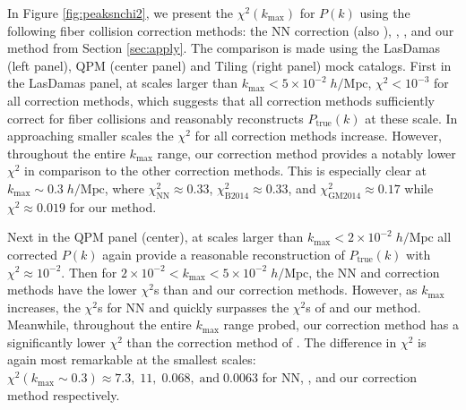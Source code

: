\documentclass{emulateapj}
\begin{document}
In Figure \ref{fig:peaksnchi2}, we present the $\chi^2(k_\mathrm{max})$ for $P(k)$ using the following fiber collision correction methods: the NN correction (also \citealt{Anderson:2012aa}), \cite{Beutler:2014aa}, \cite{Gil-Marin:2014aa}, and our method from Section \ref{sec:apply}. The comparison is made using the LasDamas (left panel), QPM (center panel) and Tiling (right panel) mock catalogs. First in the LasDamas panel, at scales larger than $k_\mathrm{max} < 5 \times 10^{-2} \; h/\mathrm{Mpc}$, $\chi^2 < 10^{-3}$ for all correction methods, which suggests that all correction methods sufficiently correct for fiber collisions and reasonably reconstructs $P_\mathrm{true}(k)$ at these scale. In approaching smaller scales the $\chi^2$ for all correction methods increase. However, throughout the entire $k_\mathrm{max}$ range, our correction method provides a notably lower $\chi^2$ in comparison to the other correction methods. This is especially clear at $k_\mathrm{max} \sim 0.3 \; h/\mathrm{Mpc}$, where $\chi^2_\mathrm{NN} \approx 0.33$, $\chi^2_\mathrm{B2014} \approx 0.33$, and $\chi^2_\mathrm{GM2014} \approx 0.17$ while $\chi^2 \approx 0.019$ for our method. 

Next in the QPM panel (center), at scales larger than $k_\mathrm{max} < 2 \times 10^{-2} \; h/\mathrm{Mpc}$ all corrected $P(k)$ again provide a reasonable reconstruction of $P_\mathrm{true}(k)$ with $\chi^2 \approx 10^{-2}$. Then for $2 \times 10^{-2} < k_\mathrm{max} < 5 \times 10^{-2}\; h/\mathrm{Mpc}$, the NN and \cite{Beutler:2014aa} correction methods have the lower $\chi^2$s than \cite{Gil-Marin:2014aa} and our correction methods. However, as $k_\mathrm{max}$ increases, the $\chi^2$s for NN and \cite{Beutler:2014aa} quickly surpasses the $\chi^2$s of \cite{Gil-Marin:2014aa} and our method. Meanwhile, throughout the entire $k_\mathrm{max}$ range probed, our correction method has a significantly lower $\chi^2$ than the correction method of \cite{Gil-Marin:2014aa}. The difference in $\chi^2$ is again most remarkable at the smallest scales: $\chi^2 (k_\mathrm{max} \sim 0.3) \approx 7.3,\;11, \;0.068, \;\mathrm{and} \; 0.0063$ for NN, \cite{Beutler:2014aa}, \cite{Gil-Marin:2014aa} and our correction method respectively. 
\end{document}
